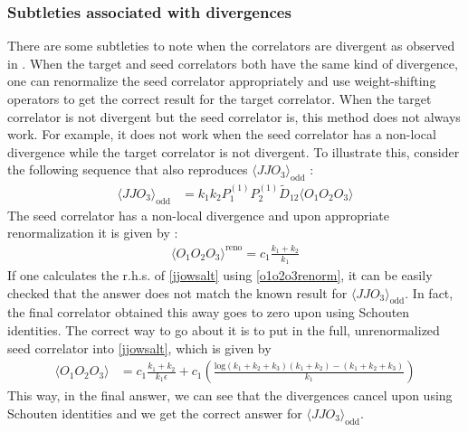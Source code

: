 \documentclass[a4paper,11pt]{article}
\begin{document}
\subsubsection{Subtleties associated with divergences}
\label{subtlety}
There are some subtleties to note when the correlators are divergent as observed in \cite{Jain:2021wyn}. When the target and seed correlators both have the same kind of divergence, one can renormalize the seed correlator appropriately and use weight-shifting operators to get the correct result for the target correlator. When the target correlator is not divergent but the seed correlator is, this method does not always work. For example, it does not work when the seed correlator has a non-local divergence while the target correlator is not divergent. To illustrate this, consider the following sequence that also reproduces $\langle JJO_3 \rangle_{\text{odd}}$ :
\begin{align}\label{jjowsalt} 
    \langle JJO_3 \rangle_{\text{odd}} &= k_1 k_2 P_1^{(1)}P_2^{(1)}\widetilde{D}_{12}\langle O_1 O_2 O_3 \rangle
\end{align}
The seed correlator has a non-local divergence and upon appropriate renormalization it is given by :
\begin{align}\label{o1o2o3renorm}
    \langle O_1 O_2 O_3 \rangle^{\text{reno}} = c_1\frac{k_1+k_2}{k_1}
\end{align}
If one calculates the r.h.s. of \eqref{jjowsalt} using \eqref{o1o2o3renorm}, it can be easily checked that the answer does not match the known result for $\langle JJO_3 \rangle_{\text{odd}}$. In fact, the final correlator obtained this away goes to zero upon using Schouten identities. The correct way to go about it is to put in the full, unrenormalized seed correlator into \eqref{jjowsalt}, which is given by
\begin{align}
    \langle O_1 O_2 O_3 \rangle &= c_1 \frac{k_1+k_2}{k_1 \epsilon}+c_1\left(\frac{\text{log}(k_1+k_2+k_3)(k_1+k_2)-(k_1+k_2+k_3)}{k_1}\right)
\end{align}
This way, in the final answer, we can see that the divergences cancel upon using Schouten identities and we get the correct answer for $\langle JJO_3 \rangle_{\text{odd}}$. 
\end{document}
